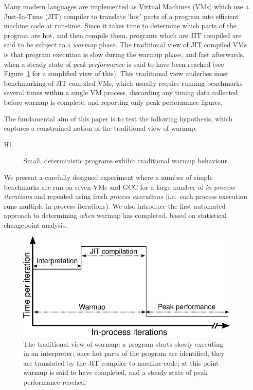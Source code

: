 \documentclass[preprint,numbers,10pt]{sigplanconf}
\newcommand{\hypone}{H1\xspace}
\begin{document}
Many modern languages are implemented as Virtual Machines (VMs) which use a
Just-In-Time (JIT) compiler to translate `hot' parts of a program into efficient
machine code at run-time. Since it takes time to determine which parts of the
program are hot, and then compile them, programs which are JIT compiled are
said to be subject to a \emph{warmup} phase. The traditional view of
JIT compiled VMs is that program execution is slow during the warmup phase, and
fast afterwards, when a steady state of \emph{peak performance} is said to have been reached
(see Figure~\ref{fig:trad} for a simplified view of this).
This traditional view underlies most benchmarking of JIT compiled VMs, which
usually require running benchmarks several times within a single VM process,
discarding any timing data collected before warmup is complete, and
reporting only peak performance figures.

The fundamental aim of this paper is to test the following hypothesis, which captures a constrained
notion of the traditional view of warmup:
\begin{description}
  \item[\hypone] Small, deterministic programs exhibit traditional warmup behaviour.
\end{description}
We present a carefully designed
experiment where a number of simple benchmarks are run on seven
VMs and GCC for a large number of \emph{in-process iterations} and repeated using fresh
\emph{process executions} (i.e.~each process execution runs multiple in-process
iterations). We also introduce the first automated approach to determining
\emph{when} warmup has completed, based on statistical changepoint analysis.

\begin{figure}[t]
\centering
\includegraphics[width=.475\textwidth]{img/picturebook_warmup}
\caption{The traditional view of warmup: a program starts slowly executing in
an interpreter; once hot parts of the program are identified, they are
translated by the JIT compiler to machine code; at this point warmup
is said to have completed, and a steady state of peak performance reached.}
\label{fig:trad}
\end{figure}
\end{document}
